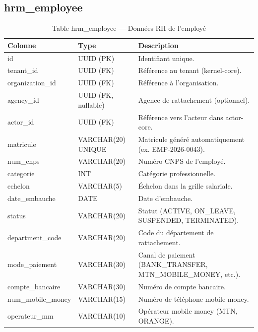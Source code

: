 \documentclass[a4paper,12pt,openany]{book}
\begin{document}
    \subsection{hrm\_employee}
    \begin{table}[H]
        \centering
        \caption{Table hrm\_employee — Données RH de l'employé}
        \begin{tabularx}{\textwidth}{llX}
    \toprule
    \textbf{Colonne} & \textbf{Type} & \textbf{Description} \\
    \midrule
    id               & UUID (PK)     & Identifiant unique. \\
    tenant\_id       & UUID (FK)     & Référence au tenant (kernel-core). \\
    organization\_id & UUID (FK)     & Référence à l'organisation. \\
    agency\_id       & UUID (FK, nullable) & Agence de rattachement (optionnel). \\
    actor\_id        & UUID (FK)     & Référence vers l'acteur dans actor-core. \\
    matricule        & VARCHAR(20) UNIQUE & Matricule généré automatiquement (ex. EMP-2026-0043). \\
    num\_cnps        & VARCHAR(20)   & Numéro CNPS de l'employé. \\
    categorie        & INT           & Catégorie professionnelle. \\
    echelon          & VARCHAR(5)    & Échelon dans la grille salariale. \\
    date\_embauche   & DATE          & Date d'embauche. \\
    status           & VARCHAR(20)   & Statut (ACTIVE, ON\_LEAVE, SUSPENDED, TERMINATED). \\
    department\_code & VARCHAR(20)   & Code du département de rattachement. \\
    mode\_paiement   & VARCHAR(30)   & Canal de paiement (BANK\_TRANSFER, MTN\_MOBILE\_MONEY, etc.). \\
    compte\_bancaire & VARCHAR(30)   & Numéro de compte bancaire. \\
    num\_mobile\_money & VARCHAR(15) & Numéro de téléphone mobile money. \\
    operateur\_mm    & VARCHAR(10)   & Opérateur mobile money (MTN, ORANGE). \\
    \bottomrule
        \end{tabularx}
    \end{table}
\end{document}
